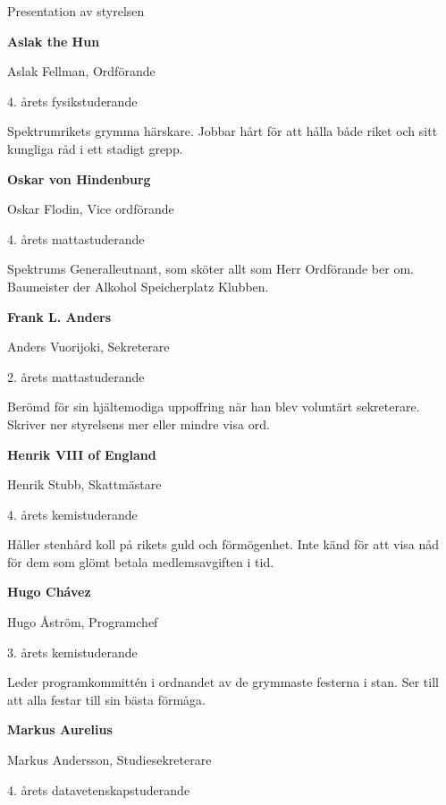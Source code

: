 \documentclass{spektraklet}
\begin{document}
\begin{artikel}{Presentation av styrelsen}{}
\begin{twocolumns}


\textbf{Aslak the Hun}

Aslak Fellman, Ordförande

4. årets fysikstuderande

Spektrumrikets grymma härskare. Jobbar hårt för att hålla både riket och sitt kungliga råd i ett stadigt grepp.


\textbf{Oskar von Hindenburg}

Oskar Flodin, Vice ordförande

4. årets mattastuderande

Spektrums Generalleutnant, som sköter allt som Herr Ordförande ber om. Baumeister der Alkohol Speicherplatz Klubben.


\textbf{Frank L. Anders}

Anders Vuorijoki, Sekreterare

2. årets mattastuderande

Berömd för sin hjältemodiga uppoffring när han blev voluntärt sekreterare. Skriver ner styrelsens mer eller mindre visa ord.


\textbf{Henrik VIII of England}

Henrik Stubb, Skattmästare

4. årets kemistuderande

Håller stenhård koll på rikets guld och förmögenhet. Inte känd för att visa nåd för dem som glömt betala medlemsavgiften i tid. 


\textbf{Hugo Chávez}

Hugo Åström, Programchef

3. årets kemistuderande

Leder programkommittén i ordnandet av de grymmaste festerna i stan. Ser till att alla festar till sin bästa förmåga.


\textbf{Markus Aurelius}

Markus Andersson, Studiesekreterare

4. årets datavetenskapstuderande


\end{twocolumns}
\end{artikel}
\end{document}
